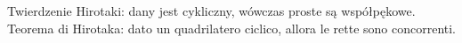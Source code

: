 
%

Twierdzenie Hirotaki: dany jest  cykliczny, wówczas proste są współpękowe. %
Teorema di Hirotaka: dato un quadrilatero ciclico, allora le rette sono concorrenti. %

%